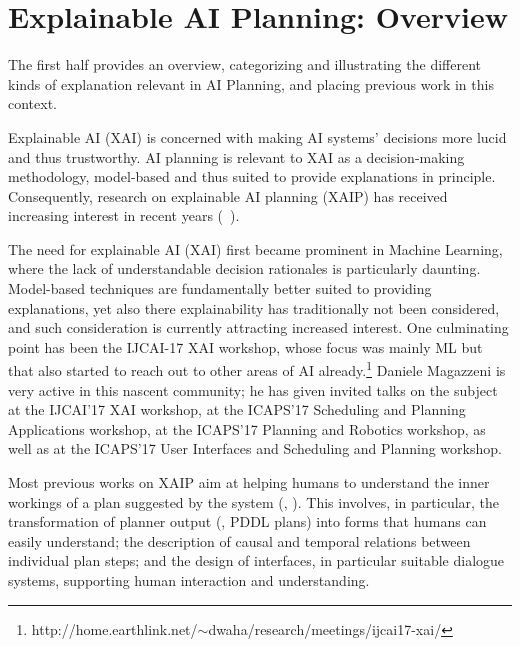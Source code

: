 \section{Explainable AI Planning: Overview}


The first half provides an overview, categorizing and illustrating the
different kinds of explanation relevant in AI Planning, and placing
previous work in this context.


Explainable AI (XAI) is concerned with making AI systems' decisions
more lucid and thus trustworthy. AI planning is relevant to XAI as a
decision-making methodology, model-based and thus suited to provide
explanations in principle. Consequently, research on explainable AI
planning (XAIP) has received increasing interest in recent years
(\eg\ \cite{seegebarth:etal:icaps-12,smith:aaai-12,langley:etal:aaai-17,fox:etal:ijcai-ws-17,chakraborti:etal:ijcai-17,chakraborti:icaps-19}).



The need for explainable AI (XAI) first became prominent in Machine
Learning, where the lack of understandable decision rationales is
particularly daunting. Model-based techniques are fundamentally better
suited to providing explanations, yet also there explainability has
traditionally not been considered, and such consideration is currently
attracting increased interest. One culminating point has been the
IJCAI-17 XAI workshop, whose focus was mainly ML but that also started
to reach out to other areas of AI
already.\footnote{http://home.earthlink.net/$\sim$dwaha/research/meetings/ijcai17-xai/}
Daniele Magazzeni is very active in this nascent community; he has
given invited talks on the subject at the IJCAI'17 XAI workshop, at
the ICAPS'17 Scheduling and Planning Applications workshop, at the
ICAPS'17 Planning and Robotics workshop, as well as at the ICAPS'17
User Interfaces and Scheduling and Planning workshop.

Most previous works on XAIP aim at helping humans to understand the
inner workings of a plan suggested by the system (\eg,
\cite{mcguiness:etal:flairs-07,khan:etal:icaps-09,bidot:etal:mkwi-10,sohrabi:etal:aaai-11,seegebarth:etal:icaps-12,bercher:etal:icaps-14,nothdurft:etal:sigdal-15}). This
involves, in particular, the transformation of planner output (\eg,
PDDL plans) into forms that humans can easily understand; the
description of causal and temporal relations between individual plan
steps; and the design of interfaces, in particular suitable dialogue
systems, supporting human interaction and understanding.

